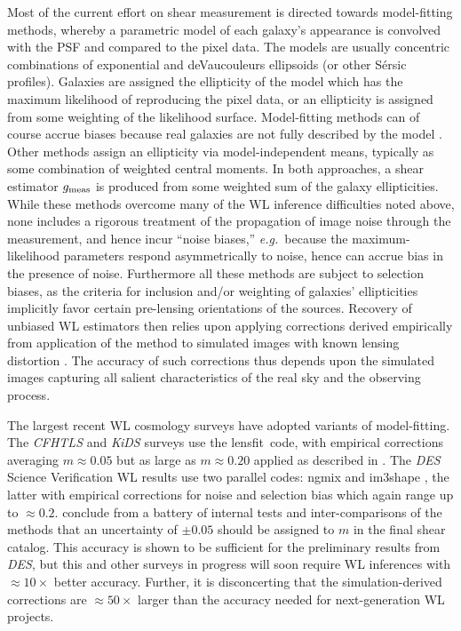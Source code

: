 \documentclass[11pt,preprint,flushrt]{aastex}
\newcommand\eg{{\it e.g.\/}}
\newcommand{\lensfit}{{\sc lensfit}}
\newcommand\edit[1]{#1}
\begin{document}
Most of the current effort on shear measurement is directed towards
model-fitting methods, whereby a parametric model of each galaxy's
appearance is convolved with the PSF and compared to the pixel data.
The models are usually concentric combinations of exponential and
deVaucouleurs ellipsoids (or other S\'{e}rsic profiles).
Galaxies are assigned the ellipticity of the model which has the
maximum likelihood of reproducing the pixel data, or an ellipticity is
assigned from some weighting of the likelihood surface.  Model-fitting
methods can of course accrue biases because real galaxies are not
fully described by the model \citep{vb,fdnt}.
Other methods 
\citep[\eg][]{ksb,bj02,fdnt} assign an ellipticity via
model-independent means, typically as some combination of weighted central
moments. In both approaches, a shear estimator $g_{\rm meas}$ is produced from
some weighted sum of the galaxy ellipticities.  While these methods
overcome many of the WL inference difficulties noted above, none
includes a rigorous treatment of the propagation of image noise
through the measurement, and hence incur ``noise biases,'' \eg\
because the maximum-likelihood parameters \edit{respond asymmetrically to
noise,} hence can accrue bias in the presence of noise.
Furthermore all these methods are subject to selection biases, as the
criteria for inclusion and/or weighting of galaxies'
ellipticities implicitly favor certain pre-lensing orientations of the
sources.  Recovery of unbiased WL estimators then relies upon applying
corrections derived empirically from application of the method to
simulated images with known lensing distortion
\citep[\eg][]{gruen,tomek}.  The accuracy of such 
corrections thus depends upon the simulated images capturing all
salient characteristics of the real sky \edit{and the observing process.}  

The largest recent WL cosmology surveys have adopted variants of
model-fitting.  The {\it CFHTLS} and {\it KiDS} surveys use the
\lensfit\ code, with empirical corrections averaging $m\approx0.05$
but as large as $m\approx0.20$ applied as described in
\citet{lensfitcfh}.  
The \emph{DES} Science Verification WL results \citep{jarvissv} use two
parallel codes: {\sc ngmix} \citep{ngmix} and {\sc im3shape} \citep{im3shape}, the
latter with empirical corrections for noise and selection bias which
again range up to $\approx0.2$.  \citet{jarvissv} conclude from
a battery of internal tests and inter-comparisons of the methods that an
uncertainty of $\pm0.05$ should be assigned to $m$ in the final shear
catalog.  This accuracy is shown to be sufficient for the
preliminary results from \emph{DES},  but this and other surveys in progress
will soon require WL inferences with $\approx10\times$ better accuracy.  Further,
it is disconcerting that the simulation-derived corrections are
$\approx50\times$ larger than the accuracy needed for next-generation
WL projects.
\end{document}
